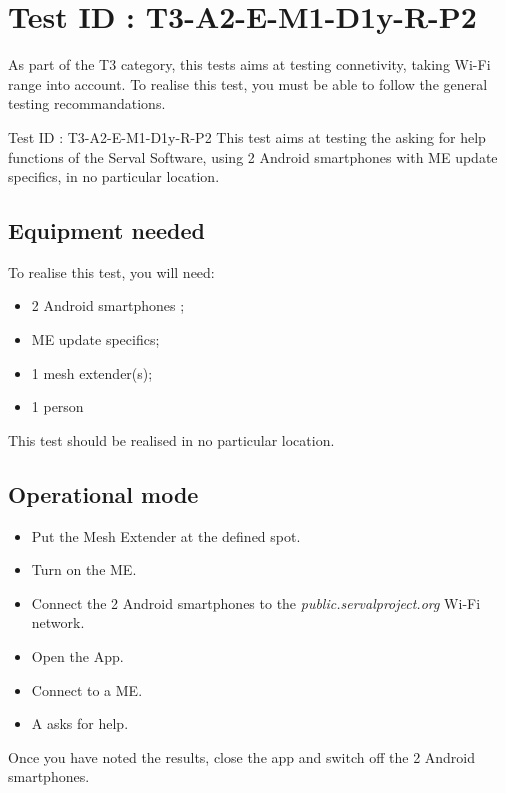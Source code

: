 \documentclass[oneside]{book}
\begin{document}
\section{Test ID : T3-A2-E-M1-D1y-R-P2}
\begin{itshape}
As part of the T3 category, this tests aims at testing connetivity, taking Wi-Fi range into account.
To realise this test, you must be able to follow the general testing recommandations.
\end{itshape}
\newline
Test ID : T3-A2-E-M1-D1y-R-P2
 This test aims at testing the asking for help functions of the Serval Software, using 2 Android smartphones with ME update specifics, in no particular location.
\subsection{Equipment needed} To realise this test, you will need:
\begin{itemize}
\item 2 Android smartphones ;
\item ME update specifics;
\item 1 mesh extender(s);
\item 1 person
\end{itemize}
This test should be realised in no particular location.
\subsection{Operational mode} \begin{itemize}
\item Put the Mesh Extender at the defined spot.
\item Turn on the ME.
\item Connect the 2 Android smartphones to the \emph{public.servalproject.org} Wi-Fi network.
\item Open the App.
\item Connect to a ME.
\item A asks for help.
\end{itemize}
Once you have noted the results, close the app and switch off the 2 Android smartphones.
\end{document}
